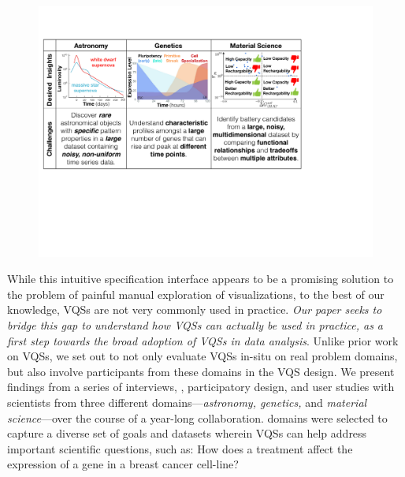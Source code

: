 \vspace{-5pt}
\begin{figure}[ht!]
	\centering
	\includegraphics[width=\linewidth]{figures/science_goal.pdf}
    \vspace{-5pt}
	\caption{}
	\label{science_goal}
	\vspace{-10pt}
\end{figure}
\vspace{-5pt}
\par While this intuitive specification interface appears to be a promising solution
to the problem of painful manual exploration of visualizations,
to the best of our knowledge, VQSs are not very commonly used in practice.
{\em Our paper seeks to bridge this gap
to understand how VQSs can actually be used in practice,
as a first step towards the broad adoption of VQSs in data analysis}.
Unlike prior work on VQSs,
we set out to not only evaluate VQSs in-situ on
real problem domains, but also involve participants
from these domains in the VQS design.
We present findings from a series of interviews,
, participatory design,
and user studies with scientists from three different domains---{\em astronomy, genetics,} and {\em material science}---over the course of
a year-long collaboration.  domains were selected to capture
a diverse set of goals
and datasets wherein VQSs can help address
important scientific questions, such as:
How does a treatment affect the expression
of a gene in a breast cancer cell-line?
